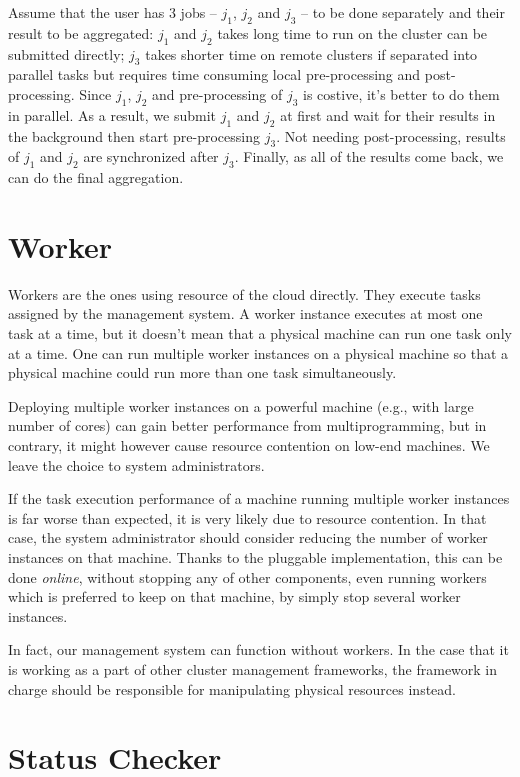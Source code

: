 Assume that the user has 3 jobs -- $j_1$, $j_2$ and $j_3$ -- to be done
separately and their result to be aggregated:  $j_1$ and $j_2$ takes
long time to run on the cluster can be submitted directly; $j_3$ takes
shorter time on remote clusters if separated into parallel tasks but
requires time consuming local pre-processing and post-processing.  Since
$j_1$, $j_2$ and pre-processing of $j_3$ is costive, it's better to do
them in parallel.  As a result, we submit $j_1$ and $j_2$ at first and
wait for their results in the background then start pre-processing
$j_3$. Not needing post-processing, results of $j_1$ and $j_2$ are
synchronized after $j_3$.  Finally, as all of the results come back, we
can do the final aggregation.

\section{Worker}

Workers are the ones using resource of the cloud directly.  They execute
tasks assigned by the management system.  A worker instance executes at
most one task at a time, but it doesn't mean that a physical machine can
run one task only at a time.  One can run multiple worker instances on a
physical machine so that a physical machine could run more than one task
simultaneously.	 

Deploying multiple worker instances on a powerful machine (e.g., with
large number of cores) can gain better performance from
multiprogramming, but in contrary, it might however cause resource
contention on low-end machines.  We leave the choice to system
administrators.  

If the task execution performance of a machine running multiple worker
instances is far worse than expected, it is very likely due to resource
contention.  In that case, the system administrator should consider
reducing the number of worker instances on that machine.  Thanks to the
pluggable implementation, this can be done \emph{online}, without
stopping any of other components, even running workers which is
preferred to keep on that machine, by simply stop several worker
instances.

In fact, our management system can function without workers.  In the
case that it is working as a part of other cluster management
frameworks, the framework in charge should be responsible for
manipulating physical resources instead.

\section{Status Checker}

